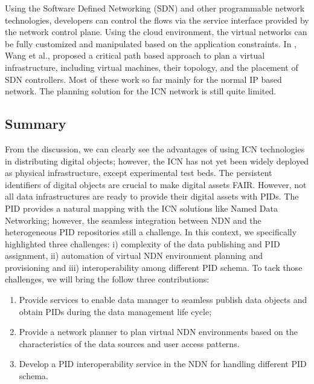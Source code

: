 \documentclass[conference]{IEEEtran}
\begin{document}
Using the Software Defined Networking (SDN) and other programmable network technologies, developers can control the flows via the service interface provided by the network control plane. Using the cloud environment, the virtual networks can be fully customized and manipulated based on the application constraints. In \cite{}, Wang et al., proposed a critical path based approach to plan a virtual infrastructure, including virtual machines, their topology, and the placement of SDN controllers. Most of these work so far mainly for the normal IP based network. The planning solution for the ICN network is still quite limited. 



\subsection{Summary}
From the discussion, we can clearly see the advantages of using ICN technologies in distributing digital objects; however, the ICN has not yet been widely deployed as physical infrastructure, except experimental test beds. The persistent identifiers of digital objects are crucial to make digital assets FAIR. However, not all data infrastructures are ready to provide their digital assets with PIDs. The PID provides a natural mapping with the ICN solutions like Named Data Networking; however, the seamless integration between NDN and the heterogeneous PID repositories still a challenge. 
In this context, we specifically highlighted three challenges: i) complexity of the data publishing and PID assignment, ii) automation of virtual NDN environment planning and provisioning and iii) interoperability among different PID schema. 
To tack those challenges, we will bring the follow three contributions:
\begin{enumerate}
    \item Provide services to enable data manager to seamless publish data objects and obtain PIDs during the data management life cycle;
    \item Provide a network planner to plan virtual NDN environments based on the characteristics of the data sources and user access patterns.
    \item Develop a PID interoperability service in the NDN for handling different PID schema. 
\end{enumerate}

 
\end{document}
